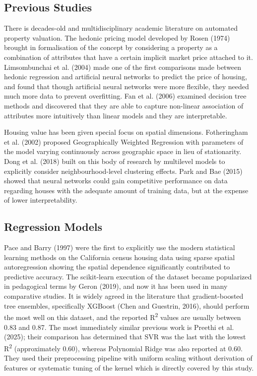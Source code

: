 \documentclass[pdflatex,sn-mathphys-num]{sn-jnl}
\begin{document}
\subsection{Previous Studies}
There is decades-old and multidisciplinary academic literature on automated property valuation. The hedonic pricing model developed by Rosen (1974) brought in formalisation of the concept by considering a property as a combination of attributes that have a certain implicit market price attached to it. Limsombunchai et al. (2004) made one of the first comparisons made between hedonic regression and artificial neural networks to predict the price of housing, and found that though artificial neural networks were more flexible, they needed much more data to prevent overfitting. Fan et al. (2006) examined decision tree methods and discovered that they are able to capture non-linear association of attributes more intuitively than linear models and they are interpretable.

Housing value has been given special focus on spatial dimensions. Fotheringham et al. (2002) proposed Geographically Weighted Regression with parameters of the model varying continuously across geographic space in lieu of stationarity. Dong et al. (2018) built on this body of research by multilevel models to explicitly consider neighbourhood-level clustering effects. Park and Bae (2015) showed that neural networks could gain competitive performance on data regarding houses with the adequate amount of training data, but at the expense of lower interpretability.


\subsection{Regression Models}

Pace and Barry (1997) were the first to explicitly use the modern statistical learning methods on the California census housing data using sparse spatial autoregression showing the spatial dependence significantly contributed to predictive accuracy. The scikit-learn execution of the dataset became popularized in pedagogical terms by Geron (2019), and now it has been used in many comparative studies. It is widely agreed in the literature that gradient-boosted tree ensembles, specifically XGBoost (Chen and Guestrin, 2016), should perform the most well on this dataset, and the reported R\textsuperscript{2} values are usually between 0.83 and 0.87. The most immediately similar previous work is Preethi et al. (2025); their comparison has determined that SVR was the last with the lowest R\textsuperscript{2} (approximately 0.60), whereas Polynomial Ridge was also reported at 0.60. They used their preprocessing pipeline with uniform scaling without derivation of features or systematic tuning of the kernel which is directly covered by this study.
\end{document}
